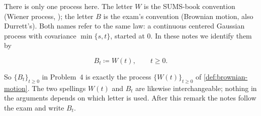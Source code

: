 \documentclass[11pt,a4paper]{article}
\begin{document}
\begin{remark}[\(W\) versus \(B\)]
\label{rem:W-vs-B}
There is only one process here. The letter \(W\) is the SUMS-book convention (Wiener process, \citep[Definition~6.9]{brzezniak1999}); the letter \(B\) is the exam's convention (Brownian motion, also Durrett's). Both names refer to the same law: a continuous centered Gaussian process with covariance \(\min\{s,t\}\), started at \(0\). In these notes we identify them by

\[
B_t
\coloneqq
W(t),
\qquad
t\ge 0.
\]

So \(\{B_t\}_{t\ge 0}\) in Problem~4 is exactly the process \(\{W(t)\}_{t\ge 0}\) of \cref{def:brownian-motion}. The two spellings \(W(t)\) and \(B_t\) are likewise interchangeable; nothing in the arguments depends on which letter is used. After this remark the notes follow the exam and write \(B_t\).
\end{remark}
\end{document}
